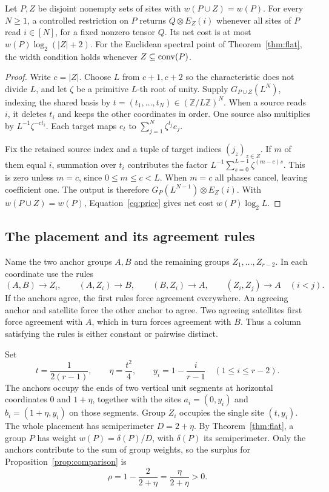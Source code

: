 \begin{lemma}\label{lem:segment}
Let \(P,Z\) be disjoint nonempty sets of sites with \(w(P\cup Z)=w(P)\).
For every \(N\ge1\), a controlled restriction on \(P\) returns
\(Q\otimes E_Z(i)\) whenever all sites of \(P\) read \(i\in[N]\),
for a fixed nonzero tensor \(Q\). Its net cost is at most
\(w(P)\log_2(|Z|+2)\). For the Euclidean spectral point of
Theorem~\ref{thm:flat}, the width condition holds whenever
\(Z\subseteq\operatorname{conv}(P)\).
\end{lemma}
\begin{proof}
Write \(c=|Z|\). Choose \(L\) from \(c+1,c+2\) so the characteristic
does not divide \(L\), and let \(\zeta\) be a primitive \(L\)-th root
of unity. Supply \(G_{P\cup Z}(L^N)\), indexing the shared basis by
\(t=(t_1,\ldots,t_N)\in(\mathbb Z/L\mathbb Z)^N\). When a source
reads \(i\), it deletes \(t_i\) and keeps the other coordinates in
order. One source also multiplies by \(L^{-1}\zeta^{-ct_i}\).
Each target maps \(e_t\) to \(\sum_{j=1}^N\zeta^{t_j}e_j\).

Fix the retained source index and a tuple of target indices
\((j_z)_{z\in Z}\). If \(m\) of them equal \(i\), summation over \(t_i\)
contributes the factor \(L^{-1}\sum_{s=0}^{L-1}\zeta^{(m-c)s}\).
This is zero unless \(m=c\), since \(0\le m\le c<L\).
When \(m=c\) all phases cancel, leaving coefficient one. The output is
therefore \(G_P(L^{N-1})\otimes E_Z(i)\). With \(w(P\cup Z)=w(P)\),
Equation~\eqref{eq:price} gives net cost \(w(P)\log_2 L\).
\end{proof}

\subsection{The placement and its agreement rules}
Name the two anchor groups \(A,B\) and the remaining groups
\(Z_1,\ldots,Z_{r-2}\). In each coordinate use the rules
\begin{equation}\label{eq:rules}
 (A,B)\to Z_i,\qquad (A,Z_i)\to B,\qquad (B,Z_i)\to A,
 \qquad (Z_i,Z_j)\to A\quad(i<j).
\end{equation}
If the anchors agree, the first rules force agreement everywhere. An
agreeing anchor and satellite force the other anchor to agree. Two
agreeing satellites first force agreement with \(A\), which in turn
forces agreement with \(B\). Thus a column satisfying the rules is
either constant or pairwise distinct.

Set
\[
   t=\frac{1}{2(r-1)},\qquad \eta=\frac{t^2}{4},\qquad
   y_i=1-\frac{i}{r-1}\quad (1\le i\le r-2).
\]
The anchors occupy the ends of two vertical unit segments at horizontal
coordinates \(0\) and \(1+\eta\), together with the sites
\(a_i=(0,y_i)\) and \(b_i=(1+\eta,y_i)\) on those segments.
Group \(Z_i\) occupies the single site \((t,y_i)\). The whole placement
has semiperimeter \(D=2+\eta\). By Theorem~\ref{thm:flat}, a group
\(P\) has weight \(w(P)=\delta(P)/D\), with \(\delta(P)\) its
semiperimeter. Only the anchors contribute to the sum of group weights,
so the surplus for Proposition~\ref{prop:comparison} is
\[
              \rho=1-\frac{2}{2+\eta}=\frac{\eta}{2+\eta}>0 .
\]

